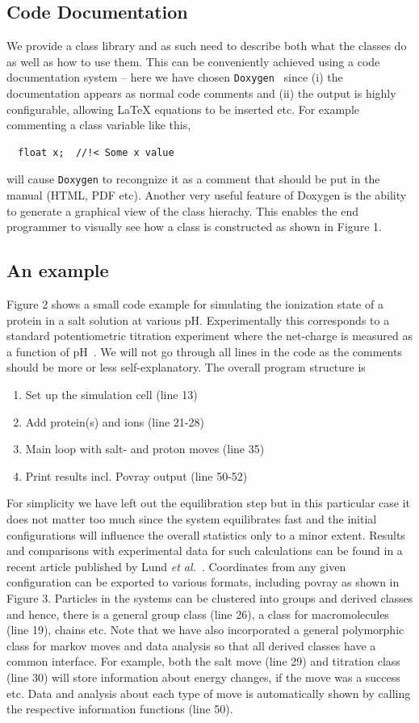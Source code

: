 \documentclass[10pt]{bmc_article}
\newenvironment{bmcformat}{\fussy\setboolean{publ}{true}}{\fussy}
\begin{document}
\begin{bmcformat}
\subsection*{Code Documentation}
We provide a class library and as such need to describe both what the classes do as well as how to use them. This can be conveniently achieved using a code documentation system -- here we have chosen \verb"Doxygen"~\cite{doxygen} since (i) the documentation appears as normal code comments and (ii) the output is highly configurable, allowing LaTeX equations to be inserted etc.
For example commenting a class variable like this,
\begin{verbatim}
  float x;  //!< Some x value
\end{verbatim}
will cause \verb"Doxygen" to recongnize it as a comment that should be put in the manual (HTML, PDF etc). Another very useful feature of Doxygen is the ability to generate a graphical view of the class hierachy. This enables the end programmer to visually see how a class is constructed as shown in Figure 1.


\subsection*{An example}
Figure 2 shows a small code example for simulating the ionization state of a protein in a salt solution at various pH. Experimentally this corresponds to a standard potentiometric titration experiment where the net-charge is measured as a function of pH~\cite{tanford:72}. We will not go through all lines in the code as the comments should be more or less self-explanatory. The overall program structure is
\begin{enumerate}
\item Set up the simulation cell (line 13)
\item Add protein(s) and ions (line 21-28)
\item Main loop with salt- and proton moves (line 35)
\item Print results incl. Povray output (line 50-52)
\end{enumerate}
For simplicity we have left out the equilibration step but in this particular case it does not matter too much since the system equilibrates fast and the initial configurations will influence the overall statistics only to a minor extent.
Results and comparisons with experimental data for such calculations can be found in a recent article published by Lund \emph{et al.}~\cite{lund:07}.
Coordinates from any given configuration can be exported to various formats, including povray as shown in Figure 3.
Particles in the systems can be clustered into groups and derived classes and hence, there is a general group class (line 26), a class for macromolecules (line 19), chains etc. Note that we have also incorporated a general polymorphic class for markov moves and data analysis so that all derived classes have a common interface. For example, both the salt move (line 29) and titration class (line 30) will store information about energy changes, if the move was a success etc. Data and analysis about each type of move is automatically shown by calling the respective information functions (line 50).


\end{bmcformat}
\end{document}
